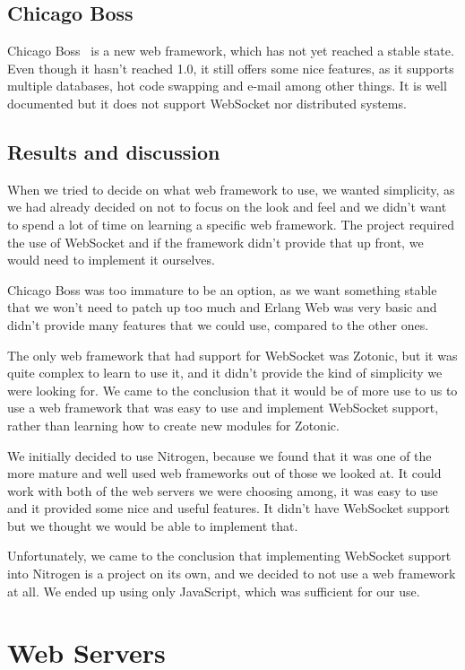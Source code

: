 \documentclass[11pt,a4paper]{report}
\begin{document}
\subsection{Chicago Boss}
Chicago Boss~\cite{chicagoboss} is a new web framework, which has not yet reached
a stable state. Even though it hasn't reached 1.0, it still offers some nice
features, as it supports multiple databases, hot code swapping and e-mail among
other things. It is well documented but it does not support WebSocket nor
distributed systems.

\subsection{Results and discussion}
When we tried to decide on what web framework to use, we wanted simplicity, as
we had already decided on not to focus on the look and feel and we didn't want
to spend a lot of time on learning a specific web framework.
The project required the use of WebSocket and if the framework didn't
provide that up front, we would need to implement it ourselves.

Chicago Boss was too immature to be an option, as we want something stable that
we won't need to patch up too much and Erlang Web was very basic and didn't
provide many features that we could use, compared to the other ones.

The only web framework that had support for WebSocket was Zotonic, but it was
quite complex to learn to use it, and it didn't provide the kind of simplicity
we were looking for. We came to the conclusion that it would be of more use to
us to use a web framework that was easy to use and implement WebSocket support,
rather than learning how to create new modules for Zotonic.

We initially decided to use Nitrogen, because we found that it was one of the
more mature and well used web frameworks out of those we looked at. It could
work with both of the web servers we were choosing among, it was easy to use and
it provided some nice and useful features. It didn't have WebSocket support but
we thought we would be able to implement that.

Unfortunately, we came to the conclusion that implementing WebSocket support
into Nitrogen is a project on its own, and we decided to not use a web
framework at all. We ended up using only JavaScript, which was sufficient for
our use.

\section{Web Servers}
\end{document}
